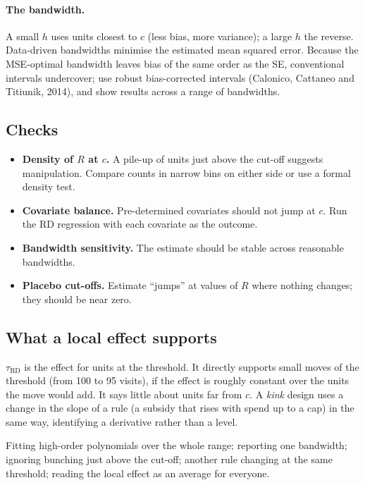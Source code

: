 \documentclass[11pt]{article}
\begin{document}
\paragraph{The bandwidth.} A small $h$ uses units closest to $c$ (less bias, more variance); a large $h$ the reverse. Data-driven bandwidths minimise
the estimated mean squared error. Because the MSE-optimal bandwidth leaves bias of the same order as the SE, conventional intervals undercover;
use robust bias-corrected intervals (Calonico, Cattaneo and Titiunik, 2014), and show results across a range of bandwidths.

\subsection{Checks}

\begin{itemize}
  \item \textbf{Density of $R$ at $c$.} A pile-up of units just above the cut-off suggests manipulation. Compare counts in narrow bins on either side or
  use a formal density test.
  \item \textbf{Covariate balance.} Pre-determined covariates should not jump at $c$. Run the RD regression with each covariate as the outcome.
  \item \textbf{Bandwidth sensitivity.} The estimate should be stable across reasonable bandwidths.
  \item \textbf{Placebo cut-offs.} Estimate ``jumps'' at values of $R$ where nothing changes; they should be near zero.
\end{itemize}

\subsection{What a local effect supports}

$\tau_{\text{RD}}$ is the effect for units at the threshold. It directly supports small moves of the threshold (from 100 to 95 visits), if the effect is
roughly constant over the units the move would add. It says little about units far from $c$. A \emph{kink} design uses a change in the slope of a
rule (a subsidy that rises with spend up to a cap) in the same way, identifying a derivative rather than a level.

\begin{pitfall}[RD errors]
Fitting high-order polynomials over the whole range; reporting one bandwidth; ignoring bunching just above the cut-off; another rule changing at the
same threshold; reading the local effect as an average for everyone.
\end{pitfall}
\end{document}

